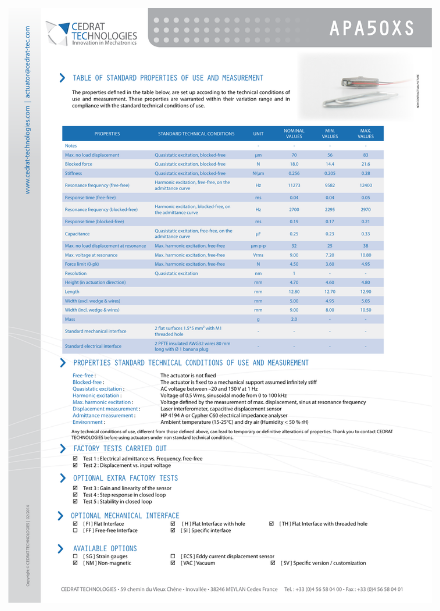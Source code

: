 \begin{figure}[!p]
\begin{center}
\includegraphics[page=1,trim={0cm 0cm 0cm 0cm},clip,scale=0.7]{../Annexes/Figure/APA50XS.pdf}
\end{center}
\end{figure}
\FloatBarrier
